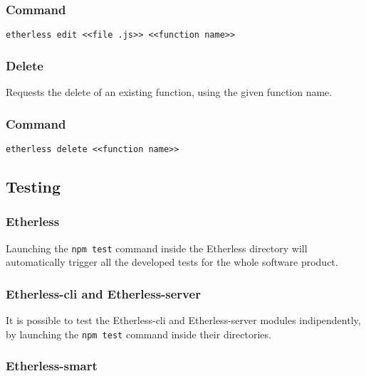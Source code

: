 \subsubsection*{Command}
\texttt{etherless edit <<file .js>> <<function name>>}
\subsubsection{Delete}
Requests the delete of an existing function, using the given function name.
\subsubsection*{Command}
\texttt{etherless delete <<function name>>}
\subsection{Testing}
\subsubsection{Etherless}
Launching the \texttt{npm test} command inside the Etherless directory will automatically trigger all the developed tests for the whole software product. 
\subsubsection{Etherless-cli and Etherless-server}
It is possible to test the Etherless-cli and Etherless-server modules indipendently, by launching the \texttt{npm test} command inside their directories. 
\subsubsection{Etherless-smart}
